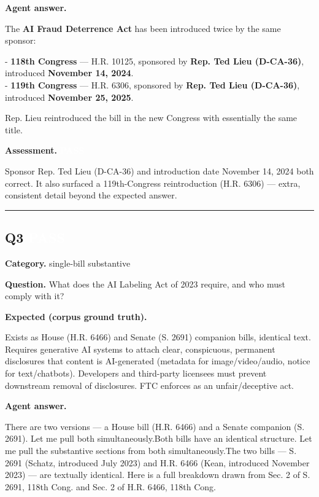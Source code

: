 \documentclass[11pt]{article}
\newcommand{\fieldlabel}[1]{\textbf{\color{navy}#1}\quad}
\begin{document}
\fieldlabel{Agent answer.}\par
The \textbf{AI Fraud Deterrence Act} has been introduced twice by the same sponsor:

- \textbf{118th Congress} --- H.R. 10125, sponsored by \textbf{Rep. Ted Lieu (D-CA-36)}, introduced \textbf{November 14, 2024}. \\
- \textbf{119th Congress} --- H.R. 6306, sponsored by \textbf{Rep. Ted Lieu (D-CA-36)}, introduced \textbf{November 25, 2025}.

Rep. Lieu reintroduced the bill in the new Congress with essentially the same title.

\fieldlabel{Assessment.} \colorbox{passgreen}{\textcolor{white}{\bfseries PASS}}\par
Sponsor Rep. Ted Lieu (D-CA-36) and introduction date November 14, 2024 both correct. It also surfaced a 119th-Congress reintroduction (H.R. 6306) --- extra, consistent detail beyond the expected answer.
\vspace{4pt}\hrule\vspace{8pt}
\subsection*{Q3 \quad \colorbox{passgreen}{\textcolor{white}{\bfseries PASS}}}
\fieldlabel{Category.} single-bill substantive\par
\fieldlabel{Question.} What does the AI Labeling Act of 2023 require, and who must comply with it?\par
\fieldlabel{Expected (corpus ground truth).}\par
Exists as House (H.R. 6466) and Senate (S. 2691) companion bills, identical text. Requires generative AI systems to attach clear, conspicuous, permanent disclosures that content is AI-generated (metadata for image/video/audio, notice for text/chatbots). Developers and third-party licensees must prevent downstream removal of disclosures. FTC enforces as an unfair/deceptive act.

\fieldlabel{Agent answer.}\par
There are two versions --- a House bill (H.R. 6466) and a Senate companion (S. 2691). Let me pull both simultaneously.Both bills have an identical structure. Let me pull the substantive sections from both simultaneously.The two bills --- S. 2691 (Schatz, introduced July 2023) and H.R. 6466 (Kean, introduced November 2023) --- are textually identical. Here is a full breakdown drawn from Sec. 2 of S. 2691, 118th Cong. and Sec. 2 of H.R. 6466, 118th Cong.
\end{document}
